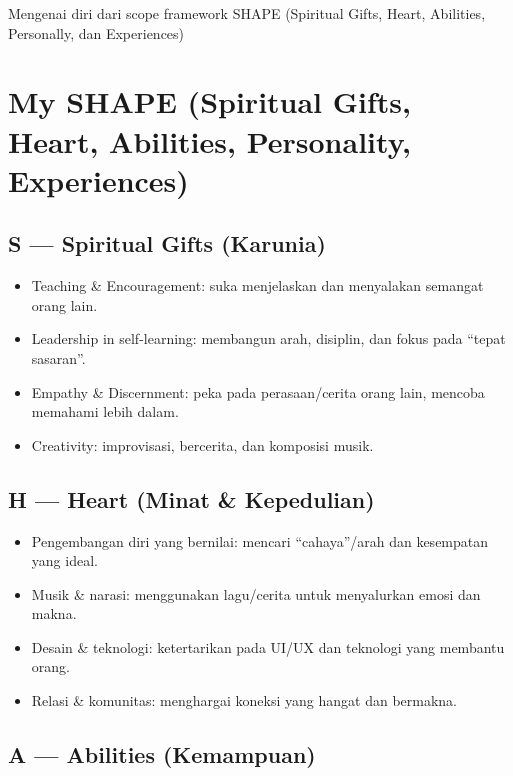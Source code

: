 \documentclass[
  letterpaper,
  DIV=11,
  numbers=noendperiod]{scrreprt}
\providecommand{\tightlist}{%
  \setlength{\itemsep}{0pt}\setlength{\parskip}{0pt}}
\begin{document}
Mengenai diri dari scope framework SHAPE (Spiritual Gifts, Heart,
Abilities, Personally, dan Experiences)

\section{My SHAPE (Spiritual Gifts, Heart, Abilities, Personality,
Experiences)}\label{my-shape-spiritual-gifts-heart-abilities-personality-experiences}

\subsection{S --- Spiritual Gifts
(Karunia)}\label{s-spiritual-gifts-karunia}

\begin{itemize}
\tightlist
\item
  Teaching \& Encouragement: suka menjelaskan dan menyalakan semangat
  orang lain.
\item
  Leadership in self-learning: membangun arah, disiplin, dan fokus pada
  ``tepat sasaran''.
\item
  Empathy \& Discernment: peka pada perasaan/cerita orang lain, mencoba
  memahami lebih dalam.
\item
  Creativity: improvisasi, bercerita, dan komposisi musik.
\end{itemize}

\subsection{H --- Heart (Minat \&
Kepedulian)}\label{h-heart-minat-kepedulian}

\begin{itemize}
\tightlist
\item
  Pengembangan diri yang bernilai: mencari ``cahaya''/arah dan
  kesempatan yang ideal.
\item
  Musik \& narasi: menggunakan lagu/cerita untuk menyalurkan emosi dan
  makna.
\item
  Desain \& teknologi: ketertarikan pada UI/UX dan teknologi yang
  membantu orang.
\item
  Relasi \& komunitas: menghargai koneksi yang hangat dan bermakna.
\end{itemize}

\subsection{A --- Abilities (Kemampuan)}\label{a-abilities-kemampuan}
\end{document}
